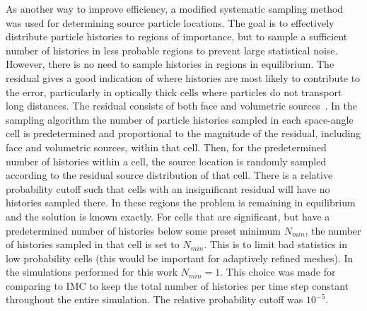 \documentclass{mc2013}
\begin{document}
As another way to improve efficiency, a modified systematic
sampling
method~\cite{shultis_mc} was used for determining source particle locations.  The goal is to effectively distribute particle
histories to regions of importance, but to sample a sufficient number of histories in
less probable regions to prevent large statistical noise.  However, there is no need
to sample histories in regions in equilibrium.
The residual gives a good indication of where
histories are most likely to contribute to the error, particularly in optically thick
cells where particles do not transport long distances.  The residual consists of both face
and volumetric sources~\cite{jake}.   
In the sampling algorithm the number of particle histories sampled in
each space-angle cell is predetermined and proportional to the magnitude of the
residual, including face and volumetric sources, within that cell.  Then, for the predetermined number of histories within a cell, the source
location is randomly sampled according to the residual source distribution of that
cell.  There is
a relative probability cutoff such that cells with an insignificant
residual will have no histories sampled there. In these regions the problem is
remaining in equilibrium and the solution is known exactly.  
For cells that are significant, but have a predetermined number of histories below some preset
minimum $N_{min}$, the number of histories sampled in that cell is set to
$N_{min}$. This is to limit
bad statistics in low probability cells (this would be important for adaptively
refined meshes).  In the simulations performed for this work $N_{min}=1$.  This
choice was made for comparing to IMC to keep the total number of histories per time step
constant throughout the entire simulation. The
relative probability cutoff was $10^{-5}$.

\end{document}
